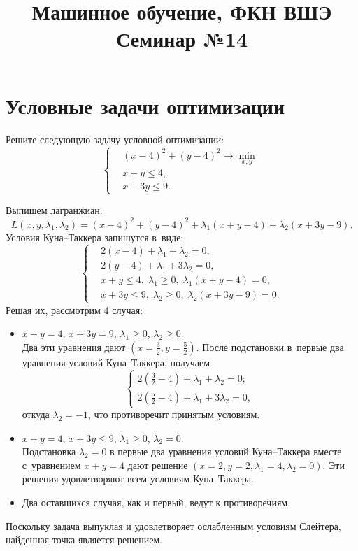\documentclass[12pt,fleqn]{article}
\begin{document}
\title{Машинное обучение, ФКН ВШЭ\\Семинар №14}
\author{}
\date{}
\maketitle

\section{Условные задачи оптимизации}

\begin{vkProblem}
	Решите следующую задачу условной оптимизации:
	\[
	\left\{
	\begin{aligned}
	& (x-4)^2 + (y-4)^2 \to \min_{x, y} \\
	& x+y \leq 4, \\
	& x+3y \leq 9.
	\end{aligned}
	\right.
	\]
\end{vkProblem}

\begin{esSolution}
	Выпишем лагранжиан:
	\[
	L(x, y, \lambda_1, \lambda_2)
	=
	(x-4)^2 + (y-4)^2 + \lambda_1(x+y-4) + \lambda_2(x+3y-9).
	\]
	Условия Куна--Таккера запишутся в~виде:
	\[
	\left\{
	\begin{aligned}
	& 2(x-4)+\lambda_1+\lambda_2 = 0, \\
	& 2(y-4)+\lambda_1+3\lambda_2 = 0, \\
	& x+y \leq 4,\; \lambda_1 \geqslant 0,\; \lambda_1(x+y -4)=0, \\
	& x+3y \leq 9,\; \lambda_2 \geqslant 0,\; \lambda_2(x+3y -9)=0.
	\end{aligned}
	\right.
	\]
	Решая их, рассмотрим 4 случая:
	\begin{itemize}
		\item
		$x+y = 4$,\: $x+3y = 9$,\: $\lambda_1\ge0$,\: $\lambda_2\ge0$.\\
		Два эти уравнения дают $(x=\frac32,y=\frac52)$.
		После подстановки в~первые два уравнения условий Куна--Таккера, получаем
		\[
		\begin{cases}
		2(\frac32-4)+\lambda_1+\lambda_2 = 0;\\
		2(\frac52-4)+\lambda_1+3\lambda_2 = 0,
		\end{cases}
		\]
		откуда $\lambda_2 = -1$, что противоречит принятым условиям.
		\item
		$x+y = 4$,\: $x+3y \le 9$,\: $\lambda_1\ge0$,\: $\lambda_2=0$.\\
		Подстановка $\lambda_2=0$ в первые два уравнения условий Куна--Таккера вместе с~уравнением $x+y = 4$ дают решение $(x=2, y=2, \lambda_1 = 4, \lambda_2=0)$.
		Эти решения удовлетворяют всем условиям Куна--Таккера.
		\item
		Два оставшихся случая, как и первый, ведут к противоречиям.
	\end{itemize}
	
	Поскольку задача выпуклая и удовлетворяет ослабленным условиям Слейтера,
	найденная точка является решением.
\end{esSolution}
\end{document}
